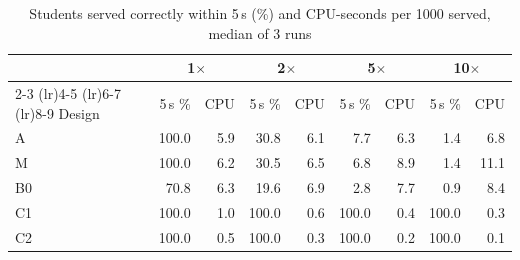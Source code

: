 \begin{table}[t]
\caption{Students served correctly within 5\,s (\%) and CPU-seconds per 1000 served, median of 3 runs}
\label{tab:core}
\centering
\footnotesize
\setlength{\tabcolsep}{3pt}
\begin{tabular}{@{}lrrrrrrrr@{}}
\toprule
 & \multicolumn{2}{c}{1$\times$} & \multicolumn{2}{c}{2$\times$} & \multicolumn{2}{c}{5$\times$} & \multicolumn{2}{c}{10$\times$} \\
\cmidrule(lr){2-3} \cmidrule(lr){4-5} \cmidrule(lr){6-7} \cmidrule(lr){8-9}
Design & 5\,s \% & CPU & 5\,s \% & CPU & 5\,s \% & CPU & 5\,s \% & CPU \\
\midrule
A & 100.0 & 5.9 & 30.8 & 6.1 & 7.7 & 6.3 & 1.4 & 6.8 \\
M & 100.0 & 6.2 & 30.5 & 6.5 & 6.8 & 8.9 & 1.4 & 11.1 \\
B0 & 70.8 & 6.3 & 19.6 & 6.9 & 2.8 & 7.7 & 0.9 & 8.4 \\
C1 & 100.0 & 1.0 & 100.0 & 0.6 & 100.0 & 0.4 & 100.0 & 0.3 \\
C2 & 100.0 & 0.5 & 100.0 & 0.3 & 100.0 & 0.2 & 100.0 & 0.1 \\
\bottomrule
\end{tabular}
\end{table}
